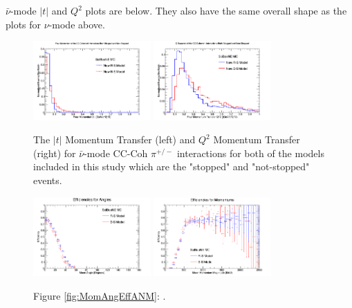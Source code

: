 \documentclass[11pt]{article}
\begin{document}
$\bar{\nu}$-mode $|t|$ and $Q^2$ plots are below. They also have the same overall shape as the plots for $\nu$-mode above.

\begin{figure}[H]
\centering
\includegraphics[width=0.4\textwidth]{CCCohPlots/ANMCCCohGoodT.png}
\includegraphics[width=0.4\textwidth]{CCCohPlots/ANMCCCohGoodQ2.png}
\caption{The $|t|$ Momentum Transfer (left) and $Q^2$ Momentum Transfer (right) for $\bar{\nu}$-mode CC-Coh $\pi^{+/-}$ interactions for both of the models included in this study which are the "stopped" and "not-stopped" events.}
\end{figure}\label{fig:AntiNuModeCCCohGoodTAndQ2}




\begin{figure}[H]
\centering
\includegraphics[width=0.4\textwidth]{ANMCombinedPlotsImages/17-ANMCombinedPlots.png}
\includegraphics[width=0.4\textwidth]{ANMCombinedPlotsImages/18-ANMCombinedPlots.png}
\caption*{Figure \ref*{fig:MomAngEffANM}: .}
\end{figure}\label{fig:MomAngEffANM}
\end{document}
